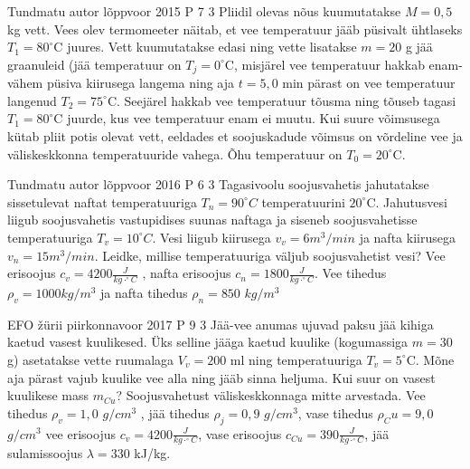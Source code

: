 \documentclass[11pt]{article}
\begin{document}
{%
{Tundmatu autor} %
{lõppvoor} %
{2015} %
{P 7} %
{3} %
{
\ifStatement
Pliidil olevas nõus kuumutatakse $M = 0,5$ kg vett. Vees olev termomeeter näitab, et vee temperatuur jääb püsivalt ühtlaseks $T_1 = 80 ^{\circ}$C juures. Vett kuumutatakse edasi ning vette lisatakse $m = 20$ g jää graanuleid (jää temperatuur on $T_{j} = 0 ^{\circ}$C, misjärel vee temperatuur hakkab enam-vähem püsiva kiirusega langema ning aja $t = 5,0$ min pärast on vee temperatuur langenud $T_2 = 75^{\circ}$C. Seejärel hakkab vee temperatuur tõusma ning tõuseb tagasi $T_1 = 80^{\circ}$C juurde, kus vee temperatuur enam ei muutu. Kui suure võimsusega kütab pliit potis olevat vett, eeldades et soojuskadude võimsus on võrdeline vee ja väliskeskkonna temperatuuride vahega. Õhu temperatuur on $T_0 = 20^{\circ}$C.
\fi
}

{Tundmatu autor} %
{lõppvoor} %
{2016} %
{P 6} %
{3} %
{
\ifStatement
Tagasivoolu soojusvahetis jahutatakse sissetulevat naftat temperatuuriga $T_n = 90 ^{\circ}C$ temperatuurini $20^{\circ}$C. Jahutusvesi liigub soojusvahetis vastupidises suunas naftaga ja siseneb soojusvahetisse temperatuuriga $T_v = 10 ^{\circ}C$. Vesi liigub kiirusega $v_v = 6 m^3/min$ ja nafta kiirusega $v_n = 15 m^3/min$. Leidke, millise temperatuuriga väljub soojusvahetist vesi? Vee erisoojus $c_v = 4200 \frac{J}{kg \cdot ^{\circ}C}$ , nafta erisoojus $c_n = 1800 \frac{J}{kg \cdot ^{\circ}C}$. Vee tihedus $\rho_v = 1000 kg/m^3$ ja nafta tihedus $\rho_n = 850$ $kg/m^3$
\fi
}

{EFO žürii} %
{piirkonnavoor} %
{2017} %
{P 9} %
{3} %
{
\ifStatement
Jää-vee anumas ujuvad paksu jää kihiga kaetud vasest kuulikesed. Üks selline jääga kaetud kuulike (kogumassiga $m = 30$ g) asetatakse vette ruumalaga $V_v = 200$ ml ning temperatuuriga $T_v = 5 ^{\circ}$C. Mõne aja pärast vajub kuulike vee alla ning jääb sinna heljuma. Kui suur on vasest kuulikese mass $m_{Cu}$? Soojusvahetust väliskeskkonnaga mitte arvestada. Vee tihedus $\rho_v = 1,0$ $g/cm^3$ , jää tihedus $\rho_j = 0,9$ $g/cm^3$, vase tihedus $\rho_Cu = 9,0$ $g/cm^3$ vee erisoojus $c_v = 4200  \frac{J}{kg \cdot ^{\circ}C}$, vase erisoojus $c_{Cu} = 390 \frac{J}{kg \cdot ^{\circ}C}$, jää sulamissoojus $\lambda = 330$ kJ/kg.
\fi
}

}
\end{document}
